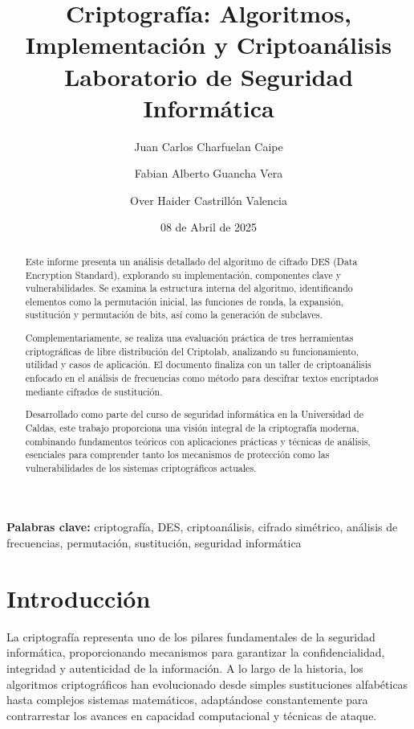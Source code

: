 \documentclass[12pt,a4paper]{article}
\begin{document}
\title{\LARGE \textbf{
		Criptografía: Algoritmos, Implementación y Criptoanálisis
	}\\\vspace{0.5cm}\Large
	Laboratorio de Seguridad Informática
}

\author[1]{Juan Carlos Charfuelan Caipe}
\author[2]{Fabian Alberto Guancha Vera}
\author[3]{Over Haider Castrillón Valencia}




\date{08 de Abril de 2025}

\maketitle

\begin{abstract}
	Este informe presenta un análisis detallado del algoritmo de cifrado DES (Data Encryption Standard), explorando su implementación, componentes clave y vulnerabilidades. Se examina la estructura interna del algoritmo, identificando elementos como la permutación inicial, las funciones de ronda, la expansión, sustitución y permutación de bits, así como la generación de subclaves.

	Complementariamente, se realiza una evaluación práctica de tres herramientas criptográficas de libre distribución del Criptolab, analizando su funcionamiento, utilidad y casos de aplicación. El documento finaliza con un taller de criptoanálisis enfocado en el análisis de frecuencias como método para descifrar textos encriptados mediante cifrados de sustitución.

	Desarrollado como parte del curso de seguridad informática en la Universidad de Caldas, este trabajo proporciona una visión integral de la criptografía moderna, combinando fundamentos teóricos con aplicaciones prácticas y técnicas de análisis, esenciales para comprender tanto los mecanismos de protección como las vulnerabilidades de los sistemas criptográficos actuales.
\end{abstract}

\textbf{Palabras clave:} criptografía, DES, criptoanálisis, cifrado simétrico, análisis de frecuencias, permutación, sustitución, seguridad informática

\section{Introducción}
La criptografía representa uno de los pilares fundamentales de la seguridad informática, proporcionando mecanismos para garantizar la confidencialidad, integridad y autenticidad de la información. A lo largo de la historia, los algoritmos criptográficos han evolucionado desde simples sustituciones alfabéticas hasta complejos sistemas matemáticos, adaptándose constantemente para contrarrestar los avances en capacidad computacional y técnicas de ataque.
\end{document}
